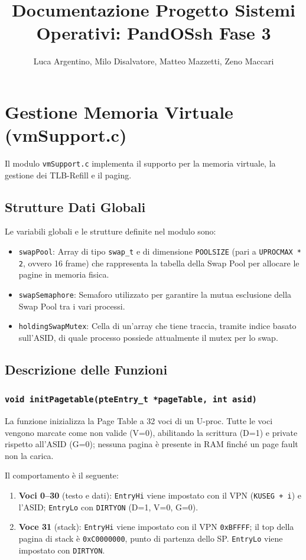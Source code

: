 \documentclass[a4paper,12pt]{article}
\title{Documentazione Progetto Sistemi Operativi: PandOSsh Fase 3}
\author{Luca Argentino, Milo Disalvatore, Matteo Mazzetti, Zeno Maccari}
\begin{document}
\maketitle
\section{Gestione Memoria Virtuale (vmSupport.c)}
Il modulo \texttt{vmSupport.c} implementa il supporto per la memoria virtuale, la gestione dei TLB-Refill e il paging.

\vspace{0.5cm}
\subsection{Strutture Dati Globali}
Le variabili globali e le strutture definite nel modulo sono:
\begin{itemize}
    \item \texttt{swapPool}: Array di tipo \texttt{swap\_t} e di dimensione \texttt{POOLSIZE} (pari a \texttt{UPROCMAX * 2}, ovvero 16 frame) che rappresenta la tabella della Swap Pool per allocare le pagine in memoria fisica.
    \item \texttt{swapSemaphore}: Semaforo utilizzato per garantire la mutua esclusione della Swap Pool tra i vari processi.
    \item \texttt{holdingSwapMutex}: Cella di un'array che tiene traccia, tramite indice basato sull'ASID, di quale processo possiede attualmente il mutex per lo swap.
\end{itemize}

\vspace{0.5cm}
\subsection{Descrizione delle Funzioni}

\subsubsection{\texttt{void initPagetable(pteEntry\_t *pageTable, int asid)}}

La funzione inizializza la Page Table a 32 voci di un U-proc. Tutte le voci vengono marcate come non valide (V=0), abilitando la scrittura (D=1) e private rispetto all'ASID (G=0); nessuna pagina è presente in RAM finché un page fault non la carica.

Il comportamento è il seguente:

\begin{enumerate}
    \item \textbf{Voci 0--30} (testo e dati): \texttt{EntryHi} viene impostato con il VPN
    (\texttt{KUSEG + i}) e l'ASID; \texttt{EntryLo} con \texttt{DIRTYON} (D=1, V=0, G=0).
    \item \textbf{Voce 31} (stack): \texttt{EntryHi} viene impostato con il VPN
    \texttt{0xBFFFF}; il top della pagina di stack è \texttt{0xC0000000}, punto di
    partenza dello SP. \texttt{EntryLo} viene impostato con \texttt{DIRTYON}.
\end{enumerate}
\end{document}
